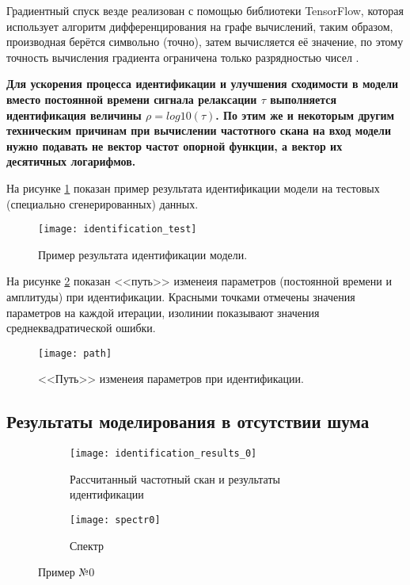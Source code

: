 	Градиентный спуск везде реализован с помощью библиотеки TensorFlow,
	которая использует алгоритм дифференцирования на графе вычислений,
	таким образом, производная берётся символьно (точно), затем вычисляется
	её значение, по этому точность вычисления градиента ограничена только
	разрядностью чисел \cite{hands_on_ml}.

	\textbf{Для ускорения процесса идентификации и улучшения сходимости
	в модели вместо постоянной времени сигнала релаксации $\tau$ 
	выполняется идентификация величины $\rho = log10(\tau)$. По этим же
	и некоторым	другим техническим причинам при вычислении частотного 
	скана на вход модели нужно подавать не вектор частот опорной 
	функции, а вектор их десятичных логарифмов.}

	На рисунке \ref{pic:identification_test} показан пример результата
	идентификации модели на тестовых (специально сгенерированных) данных.

	\begin{figure}[ht]
		\centering
		\texttt{[image: identification\_test]}
		\caption{Пример результата идентификации модели.}
		\label{pic:identification_test}
	\end{figure}

	На рисунке \ref{pic:param_path} показан <<путь>> изменеия параметров 
	(постоянной времени и амплитуды) при идентификации. Красными точками 
	отмечены значения параметров на каждой итерации, изолинии показывают 
	значения среднеквадратической ошибки.

	\begin{figure}[ht]
		\centering
		\texttt{[image: path]}
		\caption{<<Путь>> изменеия параметров при идентификации.}
		\label{pic:param_path}
	\end{figure}


	\subsection{Результаты моделирования в отсутствии шума}
	\begin{figure}[ht]
		\centering
		\begin{subfigure}{\textwidth}
			\texttt{[image: identification\_results\_0]}
			\caption{Рассчитанный частотный скан и результаты идентификации}
			\label{pic:results_0_scan}
		\end{subfigure}
		\begin{subfigure}{0.75\textwidth}
			\texttt{[image: spectr0]}
			\caption{Спектр}
			\label{pic:results_0_spectr0}
		\end{subfigure}
		\caption{Пример №0}
		\label{pic:result_0}
	\end{figure}